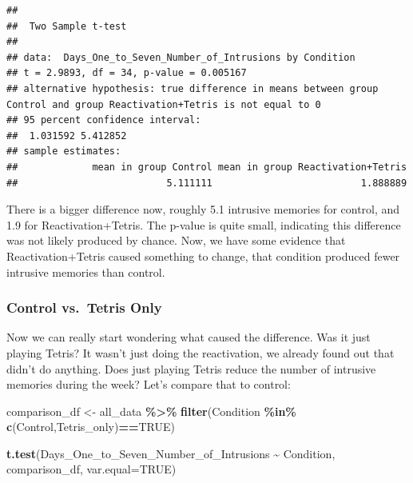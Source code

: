 \documentclass[
]{book}
\newenvironment{Shaded}{\begin{snugshade}}{\end{snugshade}}
\newcommand{\AttributeTok}[1]{\textcolor[rgb]{0.13,0.29,0.53}{#1}}
\newcommand{\ConstantTok}[1]{\textcolor[rgb]{0.56,0.35,0.01}{#1}}
\newcommand{\FunctionTok}[1]{\textcolor[rgb]{0.13,0.29,0.53}{\textbf{#1}}}
\newcommand{\NormalTok}[1]{#1}
\newcommand{\OtherTok}[1]{\textcolor[rgb]{0.56,0.35,0.01}{#1}}
\newcommand{\SpecialCharTok}[1]{\textcolor[rgb]{0.81,0.36,0.00}{\textbf{#1}}}
\newcommand{\StringTok}[1]{\textcolor[rgb]{0.31,0.60,0.02}{#1}}
\begin{document}
\begin{verbatim}
## 
##  Two Sample t-test
## 
## data:  Days_One_to_Seven_Number_of_Intrusions by Condition
## t = 2.9893, df = 34, p-value = 0.005167
## alternative hypothesis: true difference in means between group Control and group Reactivation+Tetris is not equal to 0
## 95 percent confidence interval:
##  1.031592 5.412852
## sample estimates:
##             mean in group Control mean in group Reactivation+Tetris 
##                          5.111111                          1.888889
\end{verbatim}

There is a bigger difference now, roughly 5.1 intrusive memories for control, and 1.9 for Reactivation+Tetris. The p-value is quite small, indicating this difference was not likely produced by chance. Now, we have some evidence that Reactivation+Tetris caused something to change, that condition produced fewer intrusive memories than control.

\hypertarget{control-vs.-tetris-only}{%
\subsubsection{Control vs.~Tetris Only}\label{control-vs.-tetris-only}}

Now we can really start wondering what caused the difference. Was it just playing Tetris? It wasn't just doing the reactivation, we already found out that didn't do anything. Does just playing Tetris reduce the number of intrusive memories during the week? Let's compare that to control:

\begin{Shaded}
\begin{Highlighting}[]
\NormalTok{comparison\_df }\OtherTok{\textless{}{-}}\NormalTok{ all\_data }\SpecialCharTok{\%\textgreater{}\%} 
                  \FunctionTok{filter}\NormalTok{(Condition }\SpecialCharTok{\%in\%} \FunctionTok{c}\NormalTok{(}\StringTok{\textquotesingle{}Control\textquotesingle{}}\NormalTok{,}\StringTok{\textquotesingle{}Tetris\_only\textquotesingle{}}\NormalTok{)}\SpecialCharTok{==}\ConstantTok{TRUE}\NormalTok{)}
                        
\FunctionTok{t.test}\NormalTok{(Days\_One\_to\_Seven\_Number\_of\_Intrusions }\SpecialCharTok{\textasciitilde{}}\NormalTok{ Condition, }
\NormalTok{       comparison\_df,}
       \AttributeTok{var.equal=}\ConstantTok{TRUE}\NormalTok{)}
\end{Highlighting}
\end{Shaded}
\end{document}
